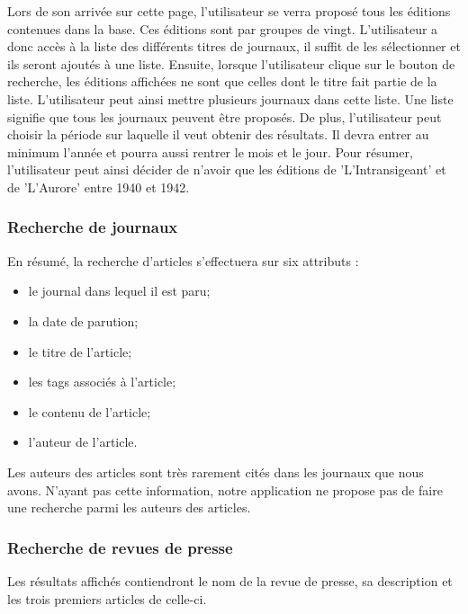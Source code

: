 Lors de son arrivée sur cette page, l'utilisateur se verra proposé tous les éditions contenues dans la base. Ces éditions sont par groupes de vingt. L'utilisateur a donc accès à la liste des différents titres de journaux, il suffit de les sélectionner et ils seront ajoutés à une liste. Ensuite, lorsque l'utilisateur clique sur le bouton de recherche, les éditions affichées ne sont que celles dont le titre fait partie de la liste. L'utilisateur peut ainsi mettre plusieurs journaux dans cette liste. Une liste signifie que tous les journaux peuvent être proposés. 
De plus, l'utilisateur peut choisir la période sur laquelle il veut obtenir des résultats. Il devra entrer au minimum l'année et pourra aussi rentrer le mois et le jour. Pour résumer, l'utilisateur peut ainsi décider de n'avoir que les éditions de 'L'Intransigeant' et de 'L'Aurore' entre 1940 et 1942. 

\subsubsection{Recherche de journaux}

\begin{leftonly}
	En résumé, la recherche d'articles s'effectuera sur six attributs :
\begin{itemize}
	\item le journal dans lequel il est paru;
	\item la date de parution;
	\item le titre de l'article;
	\item les tags associés à l'article;
	\item le contenu de l'article;
	\item l'auteur de l'article.
\end{itemize}
\end{leftonly}

Les auteurs des articles sont très rarement cités dans les journaux que nous avons. N'ayant pas cette information, notre application ne propose pas de faire une recherche parmi les auteurs des articles.

\subsubsection{Recherche de revues de presse}

\begin{leftonly}
	Les résultats affichés contiendront le nom de la revue de presse, sa description et les trois premiers articles de celle-ci.
	\end{leftonly}

